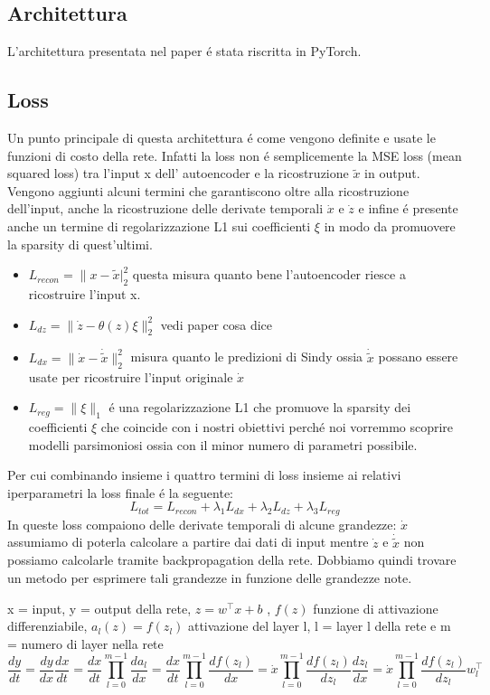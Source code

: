 \documentclass[11pt]{article}
\begin{document}
\subsection{Architettura}
L'architettura presentata nel paper é stata riscritta in PyTorch.


\subsection{Loss }
Un punto principale di questa architettura é come vengono definite e usate le funzioni di costo della rete. Infatti la loss non é semplicemente la MSE loss (mean squared loss) tra l'input x dell' autoencoder e la ricostruzione $\tilde{x}$ in output. Vengono aggiunti alcuni termini che garantiscono oltre alla ricostruzione dell'input, anche la ricostruzione delle derivate temporali $\dot{x}$ e $\dot{z}$ e infine é presente anche un termine di regolarizzazione L1 sui coefficienti $\xi $ in modo da promuovere la sparsity di quest'ultimi.
\newline

\begin{itemize}
\item $L_{recon} = \|x - \tilde{x}|_2^2 $ questa misura quanto bene l'autoencoder riesce a ricostruire l'input x.
\item $L_{dz} = \|\dot{z} - \theta(z)\xi\|_2^2 $ vedi paper cosa dice
\item $L_{dx} = \|\dot{x} - \dot{\tilde{x}}\|_2^2 $ misura quanto le predizioni di Sindy ossia $\dot{\tilde{x}}$ possano essere usate per ricostruire l'input originale $\dot{x}$
\item $L_{reg} = \|{\xi}\|_1 $ é una regolarizzazione L1 che promuove la sparsity dei coefficienti $\xi$ che coincide con i nostri obiettivi perché noi vorremmo scoprire modelli parsimoniosi ossia con il minor numero di parametri possibile.
\end{itemize}
Per cui combinando insieme i quattro termini di loss insieme ai relativi iperparametri la loss finale é la seguente: 
$$L_{tot} = L_{recon} + \lambda_1L_{dx} + \lambda_2L_{dz} + \lambda_3L_{reg} $$
In queste loss compaiono delle derivate temporali di alcune grandezze: $\dot{x}$ assumiamo di poterla calcolare a partire dai dati di input mentre $\dot{z}$ e $\dot{\tilde{x}}$ non possiamo calcolarle tramite backpropagation della rete.
Dobbiamo quindi trovare un metodo per esprimere tali grandezze in funzione delle grandezze note.

x = input, y = output della rete, $z = w^{\top}x + b$ , $f(z) $ funzione di attivazione differenziabile, $a_{l}(z) = f(z_l)$ attivazione del layer l, l = layer l  della rete e m = numero di layer nella rete
$$ 
\frac{dy}{dt} =
\frac{dy}{dx}\frac{dx}{dt} =
\frac{dx}{dt}\prod_{l=0}^{m-1} \frac{da_l}{dx} =
\frac{dx}{dt}\prod_{l=0}^{m-1} \frac{df(z_l)}{dx} =
\dot{x}\prod_{l=0}^{m-1} \frac{df(z_l)}{dz_l}\frac{dz_l}{dx} = 
\dot{x}\prod_{l=0}^{m-1} \frac{df(z_l)}{dz_l}w_l^{\top} 
$$
\end{document}
